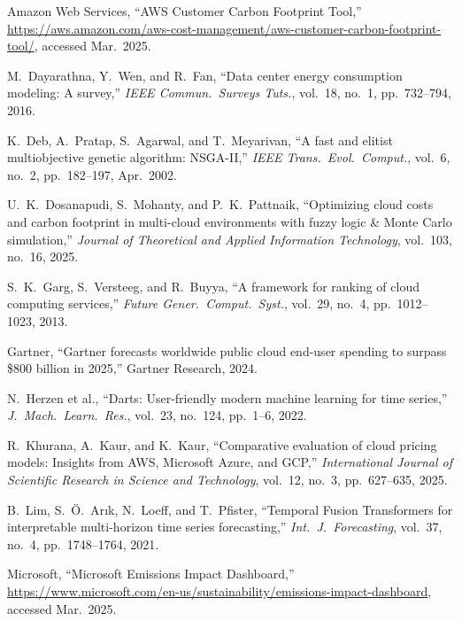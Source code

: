 \documentclass[12pt]{article}
\begin{document}
\begin{thebibliography}{}
\small

 Amazon Web Services, ``AWS Customer Carbon Footprint Tool,'' \url{https://aws.amazon.com/aws-cost-management/aws-customer-carbon-footprint-tool/}, accessed Mar.\ 2025.

 M.~Dayarathna, Y.~Wen, and R.~Fan, ``Data center energy consumption modeling: A survey,'' \textit{IEEE Commun.\ Surveys Tuts.}, vol.\ 18, no.\ 1, pp.\ 732--794, 2016.

 K.~Deb, A.~Pratap, S.~Agarwal, and T.~Meyarivan, ``A fast and elitist multiobjective genetic algorithm: NSGA-II,'' \textit{IEEE Trans.\ Evol.\ Comput.}, vol.\ 6, no.\ 2, pp.\ 182--197, Apr.\ 2002.

 U.~K.~Dosanapudi, S.~Mohanty, and P.~K.~Pattnaik, ``Optimizing cloud costs and carbon footprint in multi-cloud environments with fuzzy logic \& Monte Carlo simulation,'' \textit{Journal of Theoretical and Applied Information Technology}, vol.\ 103, no.\ 16, 2025.

 S.~K.~Garg, S.~Versteeg, and R.~Buyya, ``A framework for ranking of cloud computing services,'' \textit{Future Gener.\ Comput.\ Syst.}, vol.\ 29, no.\ 4, pp.\ 1012--1023, 2013.

 Gartner, ``Gartner forecasts worldwide public cloud end-user spending to surpass \$800 billion in 2025,'' Gartner Research, 2024.

 N.~Herzen et al., ``Darts: User-friendly modern machine learning for time series,'' \textit{J.\ Mach.\ Learn.\ Res.}, vol.\ 23, no.\ 124, pp.\ 1--6, 2022.

 R.~Khurana, A.~Kaur, and K.~Kaur, ``Comparative evaluation of cloud pricing models: Insights from AWS, Microsoft Azure, and GCP,'' \textit{International Journal of Scientific Research in Science and Technology}, vol.\ 12, no.\ 3, pp.\ 627--635, 2025.

 B.~Lim, S.~\"{O}.~Ar{\i}k, N.~Loeff, and T.~Pfister, ``Temporal Fusion Transformers for interpretable multi-horizon time series forecasting,'' \textit{Int.\ J.\ Forecasting}, vol.\ 37, no.\ 4, pp.\ 1748--1764, 2021.

 Microsoft, ``Microsoft Emissions Impact Dashboard,'' \url{https://www.microsoft.com/en-us/sustainability/emissions-impact-dashboard}, accessed Mar.\ 2025.


\end{thebibliography}
\end{document}
